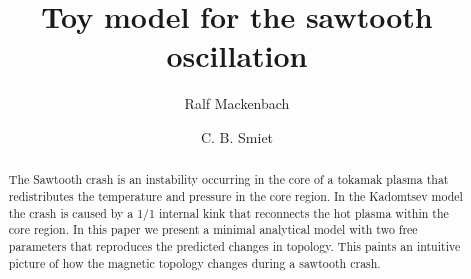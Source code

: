 \documentclass[%
superscriptaddress,
amsmath,amssymb,
aps,
pre,
floatfix,
]{revtex4-2}
\begin{document}
\title{Toy model for the sawtooth oscillation}
\author{Ralf Mackenbach}
\author{C. B. Smiet}

\begin{abstract}
  The Sawtooth crash is an instability occurring in the core of a tokamak plasma that redistributes the temperature and pressure in the core region.
  In the Kadomtsev model the crash is caused by a 1/1 internal kink that reconnects the hot plasma within the core region.
  In this paper we present a minimal analytical model with two free parameters that reproduces the predicted changes in topology.
  This paints an intuitive picture of how the magnetic topology changes during a sawtooth crash.
\end{abstract}
\maketitle
\end{document}
